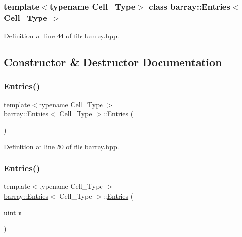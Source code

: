 \subsubsection*{template$<$typename Cell\+\_\+\+Type$>$\newline
class barray\+::\+Entries$<$ Cell\+\_\+\+Type $>$}



Definition at line 44 of file barray.\+hpp.



\subsection{Constructor \& Destructor Documentation}
\mbox{\label{classbarray_1_1_entries_a38e9bfe7feab9af33d872796a8099439}} 
\subsubsection{\texorpdfstring{Entries()}{Entries()}\hspace{0.1cm}{\footnotesize\ttfamily [1/2]}}
{\footnotesize\ttfamily template$<$typename Cell\+\_\+\+Type $>$ \\
\hyperlink{classbarray_1_1_entries}{barray\+::\+Entries}$<$ Cell\+\_\+\+Type $>$\+::\hyperlink{classbarray_1_1_entries}{Entries} (\begin{DoxyParamCaption}{ }\end{DoxyParamCaption})\hspace{0.3cm}{\ttfamily [inline]}}



Definition at line 50 of file barray.\+hpp.

\mbox{\label{classbarray_1_1_entries_ae27c7a82b7eb47a011621f63a142f7d4}} 
\subsubsection{\texorpdfstring{Entries()}{Entries()}\hspace{0.1cm}{\footnotesize\ttfamily [2/2]}}
{\footnotesize\ttfamily template$<$typename Cell\+\_\+\+Type $>$ \\
\hyperlink{classbarray_1_1_entries}{barray\+::\+Entries}$<$ Cell\+\_\+\+Type $>$\+::\hyperlink{classbarray_1_1_entries}{Entries} (\begin{DoxyParamCaption}\item[{\hyperlink{namespacebarray_af9756a31953db233f80a9cfe1ef31c32}{uint}}]{n }\end{DoxyParamCaption})\hspace{0.3cm}{\ttfamily [inline]}}




